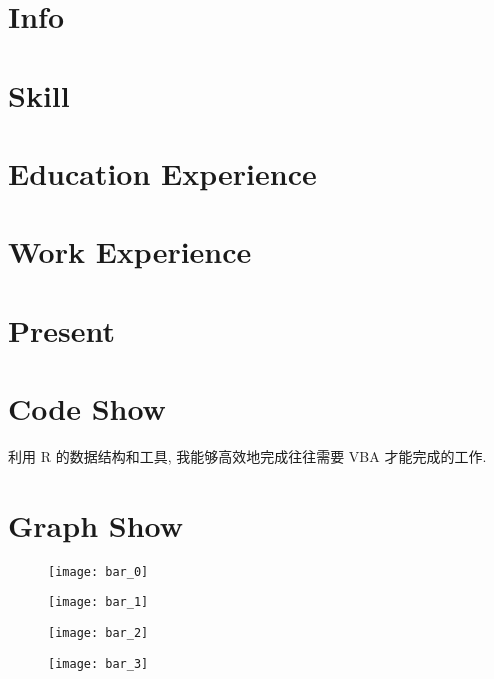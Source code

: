 \documentclass[a4paper]{article}
\begin{document}
	\section*{Info}
		
	\section*{Skill}
		
	\section*{Education Experience}
		
	\section*{Work Experience}
		
	\section*{Present}
		
	\section*{Code Show}
		利用 R 的数据结构和工具, 我能够高效地完成往往需要 VBA 才能完成的工作.
			
			
		
			
	\section*{Graph Show}
		\begin{figure}
		\begin{center}
		\texttt{[image: bar\_0]}
		\end{center}
		\end{figure}
		\begin{figure}
		\begin{center}
		\texttt{[image: bar\_1]}
		\end{center}
		\end{figure}
		\begin{figure}
		\begin{center}
		\texttt{[image: bar\_2]}
		\end{center}
		\end{figure}
		\begin{figure}
		\begin{center}
		\texttt{[image: bar\_3]}
		\end{center}
		\end{figure}
\end{document}
